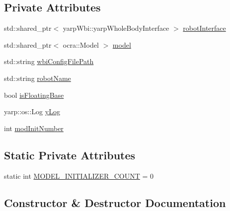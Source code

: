 \subsection*{Private Attributes}
\begin{DoxyCompactItemize}
\item 
std\+::shared\+\_\+ptr$<$ yarp\+Wbi\+::yarp\+Whole\+Body\+Interface $>$ \hyperlink{classocra__icub_1_1ModelInitializer_a86b4917ca6ebc3ec9239a4c417cb6b2a}{robot\+Interface}
\item 
std\+::shared\+\_\+ptr$<$ ocra\+::\+Model $>$ \hyperlink{classocra__icub_1_1ModelInitializer_ab7fb1fe2773837be8b3b41b75ef8f9d6}{model}
\item 
std\+::string \hyperlink{classocra__icub_1_1ModelInitializer_add617233dd3940f79f03cb6a2ed6adb5}{wbi\+Config\+File\+Path}
\item 
std\+::string \hyperlink{classocra__icub_1_1ModelInitializer_aef3121c44b93b22cf24c4ccbbc477128}{robot\+Name}
\item 
bool \hyperlink{classocra__icub_1_1ModelInitializer_a51d73f808c75fbc1284f460e7ff66d6a}{is\+Floating\+Base}
\item 
yarp\+::os\+::\+Log \hyperlink{classocra__icub_1_1ModelInitializer_a7ecf8156a05245831e51cc212eec5985}{y\+Log}
\item 
int \hyperlink{classocra__icub_1_1ModelInitializer_ab63cc70107cab38cc01a87d7a5465d85}{mod\+Init\+Number}
\end{DoxyCompactItemize}
\subsection*{Static Private Attributes}
\begin{DoxyCompactItemize}
\item 
static int \hyperlink{classocra__icub_1_1ModelInitializer_a8ec0a5af61b4a972ea22b71a5d3511eb}{M\+O\+D\+E\+L\+\_\+\+I\+N\+I\+T\+I\+A\+L\+I\+Z\+E\+R\+\_\+\+C\+O\+U\+NT} = 0
\end{DoxyCompactItemize}


\subsection{Constructor \& Destructor Documentation}
\hypertarget{classocra__icub_1_1ModelInitializer_a14a314ebc05e38e472607b76951d31cc}{}\label{classocra__icub_1_1ModelInitializer_a14a314ebc05e38e472607b76951d31cc} 
